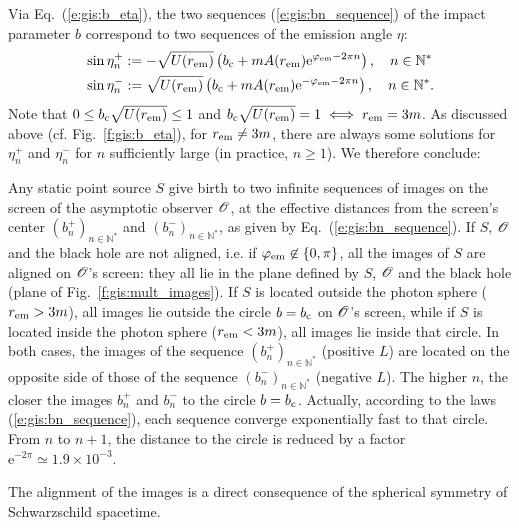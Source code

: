 Via Eq.~(\ref{e:gis:b_eta}), the two sequences (\ref{e:gis:bn_sequence}) of the impact parameter $b$
correspond to two sequences of the emission angle $\eta$:
\begin{subequations}
\begin{align}
&\sin\eta_n^+ := - \sqrt{U(r_{\rm em})}
\left( b_{\rm c} + m A(r_{\rm em})  \mathrm{e}^{\varphi_{\rm em} - 2\pi n} \right), \quad
n\in \mathbb{N}^* \\
&\sin\eta_n^- := \sqrt{U(r_{\rm em})}
\left( b_{\rm c} + m A(r_{\rm em})  \mathrm{e}^{-\varphi_{\rm em} - 2\pi n} \right),
\quad n\in \mathbb{N}^*.
\end{align}
\end{subequations}
Note that $0 \leq b_{\rm c} \sqrt{U(r_{\rm em})} \leq 1$ and
$b_{\rm c} \sqrt{U(r_{\rm em})} = 1 \iff r_{\rm em} = 3m$.
As discussed above (cf. Fig.~\ref{f:gis:b_eta}), for $r_{\rm em} \not= 3m$,
there are always some solutions for $\eta_n^+$ and $\eta_n^-$ for $n$
sufficiently large (in practice, $n\geq 1$). We therefore conclude:
\begin{prop}
Any static point source $S$ give birth to two infinite sequences of images
on the screen of the asymptotic observer $\mathscr{O}$, at the effective distances
from the screen's center
$(b_n^+)_{n\in\mathbb{N}^*}$ and $(b_n^-)_{n\in\mathbb{N}^*}$, as
given by Eq.~(\ref{e:gis:bn_sequence}).
If $S$, $\mathscr{O}$ and the black hole are not aligned, i.e. if
$\varphi_{\rm em} \not\in\{0, \pi\}$,
all the images of $S$ are aligned on $\mathscr{O}$'s screen: they
all lie in the plane defined by $S$, $\mathscr{O}$ and the black hole (plane of
Fig.~\ref{f:gis:mult_images}). If $S$ is located outside the photon sphere
($r_{\rm em} > 3m$), all images lie outside the circle $b=b_{\rm c}$ on $\mathscr{O}$'s screen,
while if $S$ is located inside the photon sphere ($r_{\rm em} < 3m$),
all images lie inside that circle. In both cases,
the images of the sequence $(b_n^+)_{n\in\mathbb{N}^*}$ (positive $L$)
are located on the opposite side of those of the sequence
$(b_n^-)_{n\in\mathbb{N}^*}$ (negative $L$). The higher $n$, the closer
the images $b_n^+$ and $b_n^-$ to the circle $b=b_{\rm c}$. Actually,
according to the laws (\ref{e:gis:bn_sequence}),
each sequence converge exponentially fast to that circle. From $n$ to $n+1$,
the distance to the circle is reduced by a factor
$\mathrm{e}^{- 2\pi}\simeq 1.9\times 10^{-3}$.
\end{prop}

\begin{remark}
The alignment of the images is a direct consequence of the spherical
symmetry of Schwarzschild spacetime.
\end{remark}

